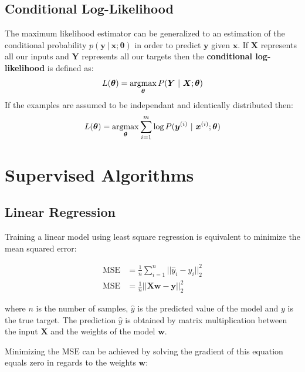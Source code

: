 \documentclass[12pt]{report}
\newcommand{\argmax}{\operatornamewithlimits{argmax}}
\begin{document}
            \subsection{Conditional Log-Likelihood}
                The maximum likelihood estimator can be generalized to an estimation of the conditional probability $p(\mathbf{y}~|~\mathbf{x}; \boldsymbol{\theta})$ in order to predict $\mathbf{y}$ given $\mathbf{x}$. If $\boldsymbol{X}$ represents all our inputs and $\boldsymbol{Y}$ represents all our targets then the \textbf{conditional log-likelihood} is defined as:
                \begin{equation}
                    L(\boldsymbol{\theta}) = \argmax_{\boldsymbol{\theta}}P(\boldsymbol{Y}~|~\boldsymbol{X};\boldsymbol{\theta})
                \end{equation}
                If the examples are assumed to be independant and identically distributed then:
                \begin{equation}
                    L(\boldsymbol{\theta}) = \argmax_{\boldsymbol{\theta}}\sum_{i=1}^{m}\text{log}\,{P(\boldsymbol{y}^{(i)}~|~\boldsymbol{x}^{(i)};\boldsymbol{\theta})}
                \end{equation}
        \section{Supervised Algorithms}
            \subsection{Linear Regression}
                Training a linear model using least square regression is equivalent to minimize the mean squared error:

                \begin{align}
                \text{MSE} &= \frac{1}{n}\sum_{i=1}^{n}{||\hat{y}_i - y_i ||_{2}^{2}} \\
                \text{MSE} &= \frac{1}{n}||\boldsymbol{X}\boldsymbol{w} - \boldsymbol{y} ||_2^2
                \end{align}
                
                where $n$ is the number of samples, $\hat{y}$ is the predicted value of the model and $y$ is the true target.
                The prediction $\hat{y}$ is obtained by matrix multiplication between the input $\boldsymbol{X}$ and the weights of the model $\boldsymbol{w}$.
                
                Minimizing the $\text{MSE}$ can be achieved by solving the gradient of this equation equals zero in regards to the weights $\boldsymbol{w}$:
                
\end{document}
